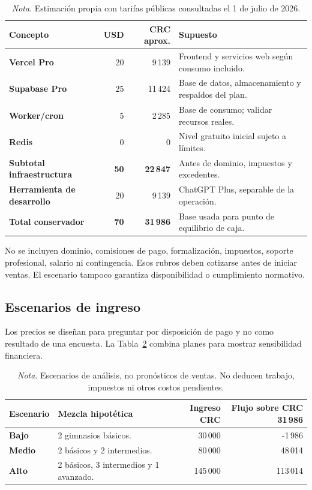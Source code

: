 \begin{table}[H]
\caption{Infraestructura mensual comercial de referencia}
\label{tab:costos-comerciales}
\begin{tabularx}{\textwidth}{>{\bfseries}p{3.5cm}r r X}
\toprule
Concepto & USD & CRC aprox. & Supuesto \\
\midrule
Vercel Pro & 20 & 9\,139 & Frontend y servicios web según consumo incluido. \\
Supabase Pro & 25 & 11\,424 & Base de datos, almacenamiento y respaldos del plan. \\
Worker/cron & 5 & 2\,285 & Base de consumo; validar recursos reales. \\
Redis & 0 & 0 & Nivel gratuito inicial sujeto a límites. \\
\midrule
\textbf{Subtotal infraestructura} & \textbf{50} & \textbf{22\,847} & Antes de dominio, impuestos y excedentes. \\
Herramienta de desarrollo & 20 & 9\,139 & ChatGPT Plus, separable de la operación. \\
\midrule
\textbf{Total conservador} & \textbf{70} & \textbf{31\,986} & Base usada para punto de equilibrio de caja. \\
\bottomrule
\end{tabularx}
\caption*{\textit{Nota}. Estimación propia con tarifas públicas consultadas el 1 de julio de 2026.}
\end{table}

No se incluyen dominio, comisiones de pago, formalización, impuestos, soporte
profesional, salario ni contingencia. Esos rubros deben cotizarse antes de iniciar
ventas. El escenario tampoco garantiza disponibilidad o cumplimiento normativo.

\subsection{Escenarios de ingreso}

Los precios se diseñan para preguntar por disposición de pago y no como resultado
de una encuesta. La Tabla~\ref{tab:ingresos} combina planes para mostrar
sensibilidad financiera.

\begin{table}[H]
\caption{Escenarios mensuales ilustrativos de ingreso}
\label{tab:ingresos}
\begin{tabularx}{\textwidth}{>{\bfseries}p{2.3cm}X r r}
\toprule
Escenario & Mezcla hipotética & Ingreso CRC & Flujo sobre CRC 31\,986 \\
\midrule
Bajo & 2 gimnasios básicos. & 30\,000 & -1\,986 \\
Medio & 2 básicos y 2 intermedios. & 80\,000 & 48\,014 \\
Alto & 2 básicos, 3 intermedios y 1 avanzado. & 145\,000 & 113\,014 \\
\bottomrule
\end{tabularx}
\caption*{\textit{Nota}. Escenarios de análisis, no pronósticos de ventas. No deducen trabajo, impuestos ni otros costos pendientes.}
\end{table}

